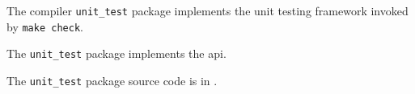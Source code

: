 
The compiler {\tt unit\_test} package implements the unit testing framework 
invoked by {\tt make check}.

The {\tt unit\_test} package implements the  api.

The {\tt unit\_test} package source code is in .

